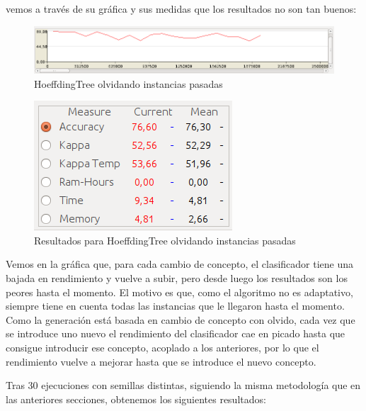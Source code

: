 vemos a través de su gráfica y sus medidas que los resultados no son tan buenos:

\begin{figure}[H] %
	\centering
	\includegraphics[scale=0.4]{graph42.png}  %
	\caption{HoeffdingTree olvidando instancias pasadas} 
	\label{fig:graph42}
\end{figure}

\begin{figure}[H] %
	\centering
	\includegraphics[scale=0.5]{measures42.png}  %
	\caption{Resultados para HoeffdingTree  olvidando instancias pasadas} 
	\label{fig:measure42}
\end{figure}

Vemos en la gráfica que, para cada cambio de concepto, el clasificador tiene una bajada en rendimiento y vuelve a subir, pero desde luego los resultados son los peores hasta el momento. El motivo es que, como el algoritmo no es adaptativo, siempre tiene en cuenta todas las instancias que le llegaron hasta el momento. Como la generación está basada en cambio de concepto con olvido, cada vez que se introduce uno nuevo el rendimiento del clasificador cae en picado hasta que consigue introducir ese concepto, acoplado a los anteriores, por lo que el rendimiento vuelve a mejorar hasta que se introduce el nuevo concepto.

Tras 30 ejecuciones con semillas distintas, siguiendo la misma metodología que en las anteriores secciones, obtenemos los siguientes resultados:

